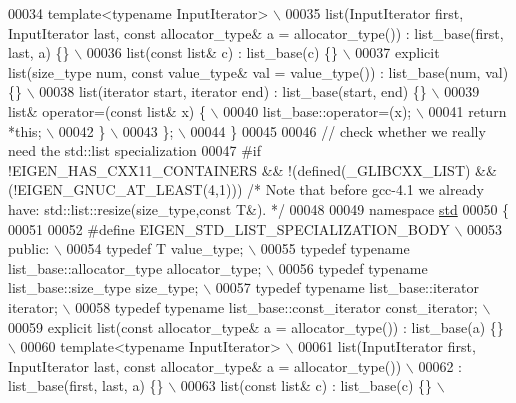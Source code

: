 \begin{DoxyCode}
00034 \textcolor{preprocessor}{    template<typename InputIterator> \(\backslash\)}
00035 \textcolor{preprocessor}{    list(InputIterator first, InputIterator last, const allocator\_type& a = allocator\_type()) :
       list\_base(first, last, a) \{\} \(\backslash\)}
00036 \textcolor{preprocessor}{    list(const list& c) : list\_base(c) \{\}  \(\backslash\)}
00037 \textcolor{preprocessor}{    explicit list(size\_type num, const value\_type& val = value\_type()) : list\_base(num, val) \{\} \(\backslash\)}
00038 \textcolor{preprocessor}{    list(iterator start, iterator end) : list\_base(start, end) \{\}  \(\backslash\)}
00039 \textcolor{preprocessor}{    list& operator=(const list& x) \{  \(\backslash\)}
00040 \textcolor{preprocessor}{      list\_base::operator=(x);  \(\backslash\)}
00041 \textcolor{preprocessor}{      return *this;  \(\backslash\)}
00042 \textcolor{preprocessor}{    \} \(\backslash\)}
00043 \textcolor{preprocessor}{  \}; \(\backslash\)}
00044 \textcolor{preprocessor}{\}}
00045 
00046 \textcolor{comment}{// check whether we really need the std::list specialization}
00047 \textcolor{preprocessor}{#if !EIGEN\_HAS\_CXX11\_CONTAINERS && !(defined(\_GLIBCXX\_LIST) && (!EIGEN\_GNUC\_AT\_LEAST(4,1))) }\textcolor{comment}{/* Note that
       before gcc-4.1 we already have: std::list::resize(size\_type,const T&). */}\textcolor{preprocessor}{}
00048 
00049 \textcolor{keyword}{namespace }\hyperlink{namespacestd}{std}
00050 \{
00051 
00052 \textcolor{preprocessor}{#define EIGEN\_STD\_LIST\_SPECIALIZATION\_BODY \(\backslash\)}
00053 \textcolor{preprocessor}{  public:  \(\backslash\)}
00054 \textcolor{preprocessor}{    typedef T value\_type; \(\backslash\)}
00055 \textcolor{preprocessor}{    typedef typename list\_base::allocator\_type allocator\_type; \(\backslash\)}
00056 \textcolor{preprocessor}{    typedef typename list\_base::size\_type size\_type;  \(\backslash\)}
00057 \textcolor{preprocessor}{    typedef typename list\_base::iterator iterator;  \(\backslash\)}
00058 \textcolor{preprocessor}{    typedef typename list\_base::const\_iterator const\_iterator;  \(\backslash\)}
00059 \textcolor{preprocessor}{    explicit list(const allocator\_type& a = allocator\_type()) : list\_base(a) \{\}  \(\backslash\)}
00060 \textcolor{preprocessor}{    template<typename InputIterator> \(\backslash\)}
00061 \textcolor{preprocessor}{    list(InputIterator first, InputIterator last, const allocator\_type& a = allocator\_type()) \(\backslash\)}
00062 \textcolor{preprocessor}{    : list\_base(first, last, a) \{\} \(\backslash\)}
00063 \textcolor{preprocessor}{    list(const list& c) : list\_base(c) \{\}  \(\backslash\)}

\end{DoxyCode}
